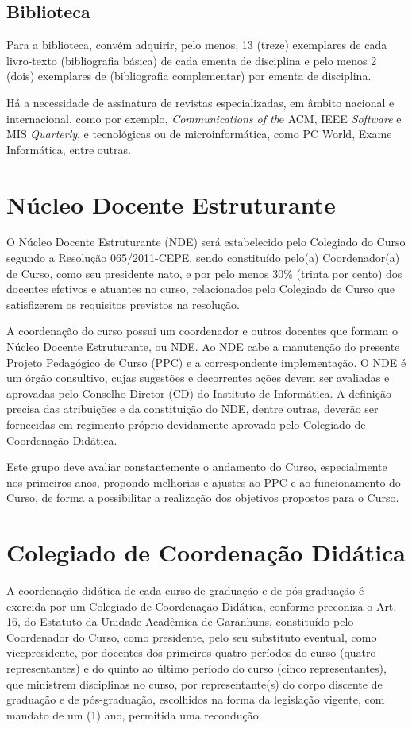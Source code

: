 \documentclass[
	12pt,				%
	openright,			%
  oneside,     %
	a4paper,			%
	english,			%
	french,				%
	spanish,			%
	brazil				%
	]{abntex2}
\begin{document}
\subsection{Biblioteca}
 
Para a biblioteca, convém adquirir, pelo menos, 13 (treze) exemplares de
cada livro-texto (bibliografia básica) de cada  ementa de disciplina e pelo menos 2 (dois) exemplares de
(bibliografia complementar) por ementa de disciplina.

Há a necessidade de assinatura de revistas especializadas, em âmbito nacional e internacional, como por exemplo, 
\textit{Communications of th}e ACM, IEEE \textit{Software} e MIS \textit{Quarterly}, e
tecnológicas ou de microinformática, como PC World, Exame Informática, entre outras.

\section{Núcleo Docente Estruturante}


O Núcleo Docente Estruturante (NDE) será estabelecido pelo Colegiado do Curso
segundo a Resolução 065/2011-CEPE, sendo constituído pelo(a) Coordenador(a)
de Curso, como seu presidente nato, e por pelo menos 30\% (trinta por cento) dos
docentes efetivos e atuantes no curso, relacionados pelo Colegiado de Curso que
satisfizerem os requisitos previstos na resolução.

A coordenação do curso possui um coordenador e outros docentes que formam o Núcleo Docente Estruturante, ou NDE. 
Ao NDE cabe a manutenção do presente Projeto Pedagógico de Curso (PPC) e a correspondente implementação. O NDE é 
um órgão consultivo, cujas sugestões e decorrentes ações devem ser avaliadas e aprovadas pelo Conselho Diretor (CD) do 
Instituto de Informática. A definição precisa das atribuições e da constituição do NDE, dentre outras, deverão ser fornecidas em regimento próprio devidamente aprovado pelo Colegiado de Coordenação Didática.


Este grupo deve avaliar constantemente o andamento do Curso, especialmente nos 
primeiros anos, propondo melhorias e ajustes ao PPC e ao funcionamento do Curso,
de forma a possibilitar a realização dos objetivos propostos para o Curso.


\section{Colegiado de Coordenação Didática}

A coordenação didática de cada curso de graduação e de
pós-graduação é exercida por um Colegiado de Coordenação Didática, conforme preconiza o Art. 16, do Estatuto da Unidade Acadêmica de Garanhuns, constituído
pelo Coordenador do Curso, como presidente, pelo seu substituto eventual,  como
vicepresidente, por docentes dos primeiros quatro períodos do curso (quatro
representantes)  e do quinto ao último período do curso (cinco representantes), 
que ministrem disciplinas no curso, por representante(s) do corpo discente de
graduação e de pós-graduação,  escolhidos na forma da legislação vigente, com
mandato de um (1) ano,  permitida uma recondução.
\end{document}
